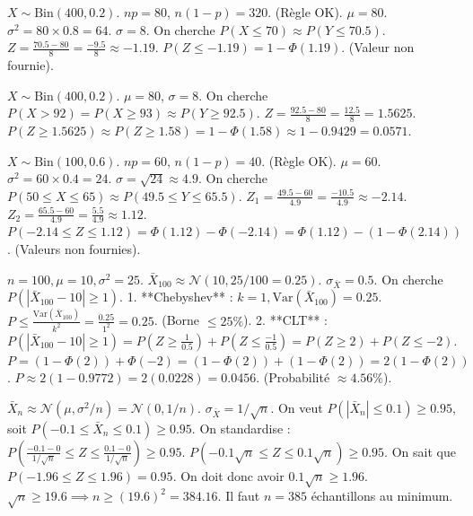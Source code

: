 \begin{correctionbox}
$X \sim \text{Bin}(400, 0.2)$. $np = 80$, $n(1-p)=320$. (Règle OK).
$\mu = 80$. $\sigma^2 = 80 \times 0.8 = 64$. $\sigma = 8$.
On cherche $P(X \le 70) \approx P(Y \le 70.5)$.
$Z = \frac{70.5 - 80}{8} = \frac{-9.5}{8} \approx -1.19$.
$P(Z \le -1.19) = 1 - \Phi(1.19)$. (Valeur non fournie).
\end{correctionbox}

\begin{correctionbox}
$X \sim \text{Bin}(400, 0.2)$. $\mu = 80$, $\sigma = 8$.
On cherche $P(X > 92) = P(X \ge 93) \approx P(Y \ge 92.5)$.
$Z = \frac{92.5 - 80}{8} = \frac{12.5}{8} = 1.5625$.
$P(Z \ge 1.5625) \approx P(Z \ge 1.58) = 1 - \Phi(1.58) \approx 1 - 0.9429 = 0.0571$.
\end{correctionbox}

\begin{correctionbox}
$X \sim \text{Bin}(100, 0.6)$. $np = 60$, $n(1-p)=40$. (Règle OK).
$\mu = 60$. $\sigma^2 = 60 \times 0.4 = 24$. $\sigma = \sqrt{24} \approx 4.9$.
On cherche $P(50 \le X \le 65) \approx P(49.5 \le Y \le 65.5)$.
$Z_1 = \frac{49.5 - 60}{4.9} = \frac{-10.5}{4.9} \approx -2.14$.
$Z_2 = \frac{65.5 - 60}{4.9} = \frac{5.5}{4.9} \approx 1.12$.
$P(-2.14 \le Z \le 1.12) = \Phi(1.12) - \Phi(-2.14) = \Phi(1.12) - (1 - \Phi(2.14))$. (Valeurs non fournies).
\end{correctionbox}

\begin{correctionbox}
$n=100, \mu=10, \sigma^2=25$. $\bar{X}_{100} \approx \mathcal{N}(10, 25/100=0.25)$. $\sigma_{\bar{X}} = 0.5$.
On cherche $P(|\bar{X}_{100} - 10| \ge 1)$.
1.  **Chebyshev** : $k=1, \text{Var}(\bar{X}_{100}) = 0.25$.
    $P \le \frac{\text{Var}(\bar{X}_{100})}{k^2} = \frac{0.25}{1^2} = 0.25$. (Borne $\le 25\%$).
2.  **CLT** : $P(|\bar{X}_{100} - 10| \ge 1) = P(Z \ge \frac{1}{0.5}) + P(Z \le \frac{-1}{0.5}) = P(Z \ge 2) + P(Z \le -2)$.
    $P = (1 - \Phi(2)) + \Phi(-2) = (1 - \Phi(2)) + (1 - \Phi(2)) = 2(1 - \Phi(2))$.
    $P \approx 2(1 - 0.9772) = 2(0.0228) = 0.0456$. (Probabilité $\approx 4.56\%$).
\end{correctionbox}

\begin{correctionbox}
$\bar{X}_n \approx \mathcal{N}(\mu, \sigma^2/n) = \mathcal{N}(0, 1/n)$. $\sigma_{\bar{X}} = 1/\sqrt{n}$.
On veut $P(|\bar{X}_n| \le 0.1) \ge 0.95$, soit $P(-0.1 \le \bar{X}_n \le 0.1) \ge 0.95$.
On standardise : $P\left( \frac{-0.1 - 0}{1/\sqrt{n}} \le Z \le \frac{0.1 - 0}{1/\sqrt{n}} \right) \ge 0.95$.
$P(-0.1\sqrt{n} \le Z \le 0.1\sqrt{n}) \ge 0.95$.
On sait que $P(-1.96 \le Z \le 1.96) = 0.95$.
On doit donc avoir $0.1\sqrt{n} \ge 1.96$.
$\sqrt{n} \ge 19.6 \implies n \ge (19.6)^2 = 384.16$.
Il faut $n=385$ échantillons au minimum.
\end{correctionbox}

